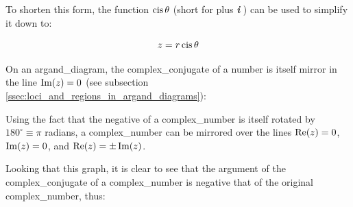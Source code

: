         To shorten this form, the \gls{function} $\operatorname{cis}\theta$ (short for  plus \textbf{\textit{i}} ) can be used to simplify it down to:

        \begin{equation}
            z=r\operatorname{cis}\theta
        \end{equation}

        On an \gls{argand_diagram}, the \gls{complex_conjugate} of a number is itself mirror in the line $\operatorname{Im}(z)=0$ (see subsection \ref{ssec:loci_and_regions_in_argand_diagrams}):

        \begin{center}
        \end{center}

        Using the fact that the negative of a \gls{complex_number} is itself rotated by $180^\circ\equiv\pi$ \glspl{radian}, a \gls{complex_number} can be mirrored over the lines $\operatorname{Re}(z)=0$, $\operatorname{Im}(z)=0$, and $\operatorname{Re}(z)=\pm\operatorname{Im}(z)$.
        
        Looking that this graph, it is clear to see that the \gls{argument} of the \gls{complex_conjugate} of a \gls{complex_number} is negative that of the original \gls{complex_number}, thus:

